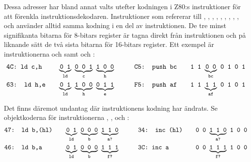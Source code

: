 \documentclass[main.tex]{subfiles}
\begin{document}
Dessa adresser har bland annat valts utefter kodningen i Z80:s instruktioner
för att förenkla instruktionsdekodaren. Instruktioner som refererar till
, , , , , , ,
, ,  och  använder alltid samma kodning i
en del av instruktionen. De tre minst signifikanta bitarna för 8-bitars
register är tagna direkt från instruktionen och på liknande sätt de två sista
bitarna för 16-bitars register. Ett exempel är instruktionerna 
och  samt  och :
\begin{align*}
    &\texttt{4C: ld c,h}& \quad &
    {\underbrace{\texttt{0 1}}_{\texttt{ld}}}\texttt{ }
    {\underbrace{\texttt{0 0 1}}_{\texttt{c}}}\texttt{ }
    {\underbrace{\texttt{1 0 0}}_{\texttt{h}}}
    \qquad
    &\texttt{C5: push bc}& \quad &
    \texttt{1 1 }
    {\underbrace{\texttt{0 0}}_{\texttt{bc}}}\texttt{ }
    \texttt{0 1 0 1}
    \\
    &\texttt{63: ld h,e} &&
    {\underbrace{\texttt{0 1}}_{\texttt{ld}}}\texttt{ }
    {\underbrace{\texttt{1 0 0}}_{\texttt{h}}}\texttt{ }
    {\underbrace{\texttt{0 1 1}}_{\texttt{e}}}
    &\texttt{F5: push af} &&
    \texttt{1 1 }
    {\underbrace{\texttt{1 1}}_{\texttt{af}}}\texttt{ }
    \texttt{0 1 0 1}
\end{align*}

Det finns däremot undantag där instruktionens kodning har ändrats. Se
objektkoderna för instruktionerna , ,  och :
\begin{align*}
    &\texttt{47: ld b,(hl)}& \quad &
    {\underbrace{\texttt{0 1}}_{\texttt{ld}}}\texttt{ }
    {\underbrace{\texttt{0 0 0}}_{\texttt{b}}}\texttt{ }
    {\underbrace{\texttt{1 1 0}}_{\texttt{a?}}}
    \qquad
    &&\texttt{34: inc (hl)} &\quad &
    \texttt{0 0 }
    {\underbrace{\texttt{1 1 0}}_{\texttt{a?}}}\texttt{ }
    \texttt{1 0 0}
    \\
    &\texttt{46: ld b,a} &&
    {\underbrace{\texttt{0 1}}_{\texttt{ld}}}\texttt{ }
    {\underbrace{\texttt{0 0 0}}_{\texttt{b}}}\texttt{ }
    {\underbrace{\texttt{1 1 1}}_{\texttt{f?}}}
    &&\texttt{3C: inc a} &&
    \texttt{0 0 }
    {\underbrace{\texttt{1 1 1}}_{\texttt{f?}}}\texttt{ }
    \texttt{1 0 0}
\end{align*}
\end{document}
